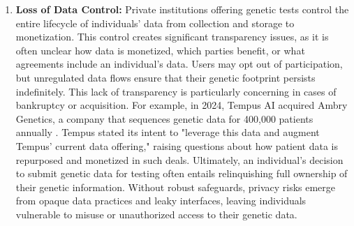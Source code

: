 \begin{enumerate}
    \item \textbf{Loss of Data Control: } 
    Private institutions offering genetic tests control the entire lifecycle of individuals' data from collection and storage to monetization. This control creates significant transparency issues, as it is often unclear how data is monetized, which parties benefit, or what agreements include an individual’s data. Users may opt out of participation, but unregulated data flows ensure that their genetic footprint persists indefinitely. This lack of transparency is particularly concerning in cases of bankruptcy or acquisition. For example, in 2024, Tempus AI acquired Ambry Genetics, a company that sequences genetic data for 400,000 patients annually \cite{tempus2025}. Tempus stated its intent to "leverage this data and augment Tempus' current data offering," raising questions about how patient data is repurposed and monetized in such deals. Ultimately, an individual’s decision to submit genetic data for testing often entails relinquishing full ownership of their genetic information. Without robust safeguards, privacy risks emerge from opaque data practices and leaky interfaces, leaving individuals vulnerable to misuse or unauthorized access to their genetic data. 
    

\end{enumerate}
